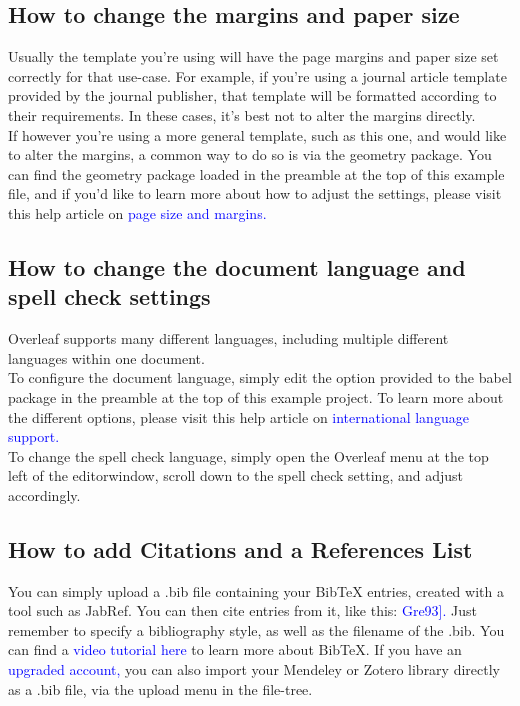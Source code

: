 \documentclass{article}
\begin{document}
	\subsection{How to change the margins and paper size}
	Usually the template you’re using will have the page margins and paper size set correctly for that
	use-case. For example, if you’re using a journal article template provided by the journal publisher,
	that template will be formatted according to their requirements. In these cases, it’s best not to alter
	the margins directly.\\
\hspace{0.5cm}If however you’re using a more general template, such as this one, and would like to alter  the margins, a common way to do so is via the geometry package. You can find the geometry package
	loaded in the preamble at the top of this example file, and if you’d like to learn more about how to
	adjust the settings, please visit this help article on \textcolor{blue}{page size and margins.}
	\subsection{How to change the document language and spell check settings}
	Overleaf supports many different languages, including multiple different languages within one document.\\
	\hspace{0.5cm}To configure the document language, simply edit the option provided to the babel package in the
	preamble at the top of this example project. To learn more about the different options, please visit
	this help article on \textcolor{blue}{international language support.}\\
	\hspace{0.5cm}To change the spell check language, simply open the Overleaf menu at the top left of the editorwindow, scroll down to the spell check setting, and adjust accordingly.
	\subsection{How to add Citations and a References List}
	You can simply upload a .bib file containing your BibTeX entries, created with a tool such as JabRef.
	You can then cite entries from it, like this: 
	\textcolor{blue}{Gre93].} Just remember to specify a bibliography style, as
	well as the filename of the .bib. You can find a \textcolor{blue}{video tutorial here} to learn more about BibTeX.
	If you have an \textcolor{blue}{upgraded account,} you can also import your Mendeley or Zotero library directly as
	a .bib file, via the upload menu in the file-tree.
\end{document}

